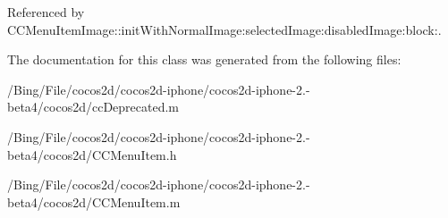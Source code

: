 Referenced by C\-C\-Menu\-Item\-Image\-::init\-With\-Normal\-Image\-:selected\-Image\-:disabled\-Image\-:block\-:.



The documentation for this class was generated from the following files\-:\begin{DoxyCompactItemize}
\item 
/\-Bing/\-File/cocos2d/cocos2d-\/iphone/cocos2d-\/iphone-\/2.-\/beta4/cocos2d/cc\-Deprecated.\-m\item 
/\-Bing/\-File/cocos2d/cocos2d-\/iphone/cocos2d-\/iphone-\/2.-\/beta4/cocos2d/C\-C\-Menu\-Item.\-h\item 
/\-Bing/\-File/cocos2d/cocos2d-\/iphone/cocos2d-\/iphone-\/2.-\/beta4/cocos2d/C\-C\-Menu\-Item.\-m\end{DoxyCompactItemize}

